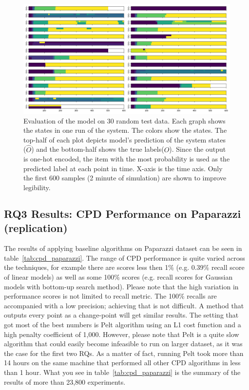\begin{figure}
    \centering
    \includegraphics[width=\linewidth]{ASE_files/test_0.png}
    \caption{Evaluation of the model on 30 random test data. Each graph shows the states in one run of the system. The colors show the states. The top-half of each plot depicts model's prediction of the system states ($\hat{O}$) and the bottom-half shows the true labels($O$). Since the output is one-hot encoded, the item with the most probability is used as the predicted label at each point in time. X-axis is the time axis. Only the first 600 samples (2 minute of simulation) are shown to improve legibility.}
    \label{fig:test_0}
\end{figure}

\subsection{RQ3 Results: CPD Performance on Paparazzi (replication)}
The results of applying baseline algorithms on Paparazzi dataset can be seen in table~\ref{tab:cpd_paparazzi}.
The range of CPD performance is quite varied across the techniques, for example there are scores less then 1\% (e.g. 0.39\% recall score of linear models) as well as some 100\% scores (e.g. recall scores for Gaussian models with bottom-up search method). Please note that the high variation in performance scores is not limited to recall metric.
The 100\% recalls are accompanied with a low precision; achieving that is not difficult. A method that outputs every point as a change-point will get similar results. 
The setting that got most of the best numbers is Pelt algorithm using an L1 cost function and a high penalty coefficient of 1,000. However, please note that Pelt is a quite slow algorithm that could easily become infeasible to run on larger dataset, as it was the case for the first two RQs. 
As a matter of fact, running Pelt took more than 14 hours on the same machine that performed all other CPD algorithms in less than 1 hour. What you see in table~\ref{tab:cpd_paparazzi} is the summary of the results of more than 23,800 experiments. 

